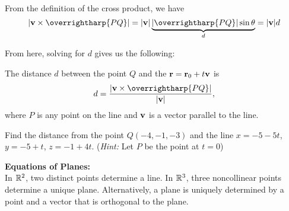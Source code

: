 \documentclass[mathNotesPreamble]{subfiles}
\begin{document}
  From the definition of the cross product, we have
    \[\abs{\vecv\times\overrightharp{PQ}}=\abs{\vecv}\underbrace{\abs{\overrightharp{PQ}}\sin\theta}_{d}=\abs{\vecv}d\]

  From here, solving for $d$ gives us the following:
  \vspace*{0.5\baselineskip}
  
  \begin{thmBox*}
    The distance $d$ between the point $Q$ and the ${\mathbf{r}} ={\mathbf{r}}_0+t{\mathbf{v}}$ is
      \[d=\frac{\abs{\vecv\times \overrightharp{PQ}}}{\abs{\vecv}},\]
    where $P$ is any point on the line and ${\mathbf{v}}$ is a vector parallel to the line.
  \end{thmBox*}

  \begin{ex*}
    Find the distance from the point $Q(-4,-1,-3)$ and the line $x=-5-5t$, $y=-5+t$, $z=-1+4t$. (\textit{Hint:} Let $P$ be the point at $t=0$)

  \end{ex*}
  \pagebreak

  \textbf{Equations of Planes:}\\
  In $\mathbb{R}^2$, two distinct points determine a line. \newline
  In $\mathbb{R}^3$, three noncollinear points determine a unique plane. Alternatively, a plane is uniquely determined by a point and a vector that is orthogonal to the plane.
\end{document}

